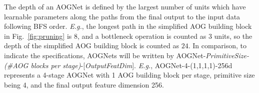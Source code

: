 \documentclass[10pt,twocolumn,letterpaper]{article}
\begin{document}
{The depth of an AOGNet} is defined by the largest number of units which have learnable parameters along the paths from the final output to the input data following BFS order. \emph{E.g.}, the longest path in the simplified AOG building block in Fig.~\ref{fig:pruning} is $8$, and a bottleneck operation is counted as $3$ units, so the depth of the simplified AOG building block is counted as $24$. 
In comparison, to indicate the specifications, AOGNets will be written by AOGNet-\textit{PrimitiveSize-(\#AOG blocks per stage)}-[\textit{OutputFeatDim}]. \emph{E.g.},  AOGNet-4-(1,1,1,1)-256d represents a 4-stage AOGNet with 1 AOG building block per stage, primitive size being 4, and the final output feature dimension 256.

 \begin{table}[t]
        \centering 
        \small{
        }
\end{table}
\end{document}
